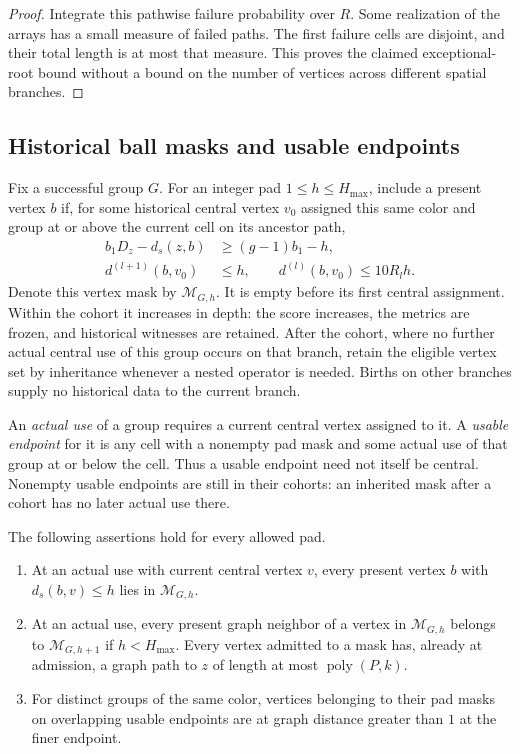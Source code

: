 \begin{proof}
Integrate this pathwise failure probability over $R$.  Some realization
of the arrays has a small measure of failed paths.  The first failure
cells are disjoint, and their total length is at most that measure.
This proves the claimed exceptional-root bound without a bound on the
number of vertices across different spatial branches.
\end{proof}

\subsection{Historical ball masks and usable endpoints}

Fix a successful group $G$.  For an integer pad $1\le h\le H_{\max}$,
include a present vertex $b$ if, for some historical central vertex
$v_0$ assigned this same color and group at or above the current cell
on its ancestor path,
\begin{equation*}
 \begin{split}
 b_1D_z-d_s(z,b)&\ge(g-1)b_1-h,\\
 d^{(l+1)}(b,v_0)&\le h,\qquad
 d^{(l)}(b,v_0)\le10R_lh.
 \end{split}
 \tag{12}\label{eq:src-12}
\end{equation*}
Denote this vertex mask by $\mathcal M_{G,h}$.  It is empty before its
first central assignment.  Within the cohort it increases in depth:
the score increases, the metrics are frozen, and historical witnesses
are retained.  After the cohort, where no further actual central use of
this group occurs on that branch, retain the eligible vertex set by
inheritance whenever a nested operator is needed.  Births on other
branches supply no historical data to the current branch.

An \emph{actual use} of a group requires a current central vertex
assigned to it.  A \emph{usable endpoint} for it is any cell with a
nonempty pad mask and some actual use of that group at or below the cell.  Thus a
usable endpoint need not itself be central.  Nonempty usable endpoints
are still in their cohorts: an inherited mask after a cohort has no
later actual use there.

\begin{lemma}
\label{lem:historical-masks}
The following assertions hold for every allowed pad.
\begin{enumerate}
\item At an actual use with current central vertex $v$, every present
vertex $b$ with $d_s(b,v)\le h$ lies in $\mathcal M_{G,h}$.
\item At an actual use, every present graph neighbor of a vertex in
$\mathcal M_{G,h}$ belongs to $\mathcal M_{G,h+1}$ if $h<H_{\max}$.
Every vertex admitted to a mask has, already at admission, a graph path
to $z$ of length at most $\operatorname{poly}(P,k)$.
\item For distinct groups of the same color, vertices belonging to their
pad masks on overlapping usable endpoints are at graph distance greater
than $1$ at the finer endpoint.
\end{enumerate}
\end{lemma}

